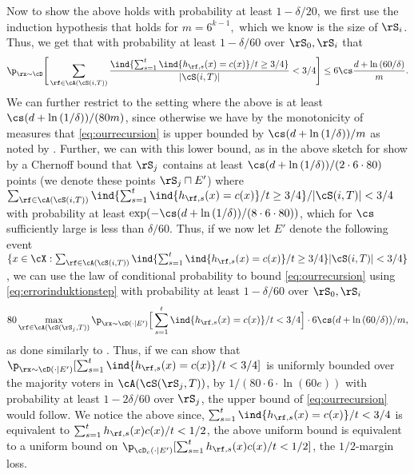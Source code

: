 Now to show the above holds with probability at least $ 1-\delta/20 $, we first use the induction hypothesis that holds for $m=6^{k-1},$ which we know is the size of $ \rS_{i} $. Thus, we get that with probability at least $ 1-\delta/60 $ over $ \rS_{0},\rS_{i} $ that 
\vspace{-0.2cm}
\begin{align}\label{eq:errorinduktionstep}
    \p_{\rx\sim\cD}\Bigg[ \sum_{\rf\in \cA(\cS (i,T))} \frac{\ind\{\sum_{s=1}^{t} \ind\{h_{\rf,s}(x)=c(x)\}/t\geq 3/4\}}{|\cS(i,T)|}
    <3/4\Bigg]\leq 6\cs \frac{d+\ln{\left(60/\delta \right)}}{m}.
  \end{align} 
  \vspace{-0.4cm} \newline We can further restrict to the setting where the above is at least $ \cs (d+\ln{\left(1/\delta \right)})/(80m) $, since otherwise we have by the monotonicity of measures that \cref{eq:ourrecursion} is upper bounded by $ \cs(d+\ln{\left(1/\delta \right)})/m $ as noted by \cite{hannekeoptimal}. Further, we can with this lower bound, as in the above sketch for \cite{hannekeoptimal} show by a Chernoff bound that $ \rS_{j} $ contains at least $ \cs (d+\ln{\left(1/\delta \right)})/(2\cdot6\cdot80) $ points (we denote these points $ \rS_{j}\sqcap E' $) where $ \sum_{\rf\in \cA(\cS (i,T))} \ind\{\sum_{s=1}^{t} \ind\{h_{\rf,s}(x)=c(x)\}/t\geq 3/4\}/|\cS(i,T)|
<3/4 $ with probability at least $ \exp(-\cs (d+\ln{\left(1/\delta \right)})/(8\cdot 6\cdot80)) $, which for $ \cs $ sufficiently large is less than $ \delta/60 $. Thus, if we now let $ E' $ denote the following event  $\{x\in \cX: \sum_{\rf\in \cA(\cS (i,T))}\ind\{\sum_{s=1}^{t} \ind\{h_{\rf,s}(x)=c(x)\}/t\geq 3/4\}|\cS(i,T)|
<3/4 \}$,  we can use the law of conditional probability to bound \cref{eq:ourrecursion} using \cref{eq:errorinduktionstep} with probability at least $ 1-\delta/60 $ over $ \rS_{0},\rS_{i} $  
\vspace{-0.3cm}
\begin{align}\label{eq:laststepininduktionstep}
    80\max_{\rf\in\cA(\cS(\rS_{j},T))}\p_{\rx\sim\cD(\cdot|E')}\Big[ \sum_{s=1}^{t} \ind\{h_{\rf,s}(x)=c(x)\}/t< 3/4\Big] \cdot 6\cs (d+\ln{\left(60/\delta \right)})/m,  
  \end{align} 
  \vspace{-0.4cm} \newline as done similarly to \cite{hannekeoptimal}. Thus, if we can show that $\p_{\rx\sim\cD(\cdot|E')}[ \sum_{s=1}^{t} \ind\{h_{\rf,s}(x)=c(x)\}/t< 3/4]$ is uniformly bounded over the majority voters in  $ \cA(\cS(\rS_{j},T))$,  by $ 1/(80\cdot 6\cdot \ln{\left(60e \right)}) $ with probability at least $ 1-2\delta/60 $ over $ \rS_{j} $,  the upper bound of \cref{eq:ourrecursion} would follow. We notice the above since, $ \sum_{s=1}^{t} \ind\{h_{\rf,s}(x)=c(x)\}/t< 3/4 $ is equivalent to $ \sum_{s=1}^{t} h_{\rf,s}(x)c(x)/t< 1/2 $, the above uniform bound is equivalent to a uniform bound on  $ \p_{\cD_{c}(\cdot|E')}[\sum_{s=1}^{t} h_{\rf,s}(x)c(x)/t<1/2]$, the $ 1/2 $-margin loss. 
  
